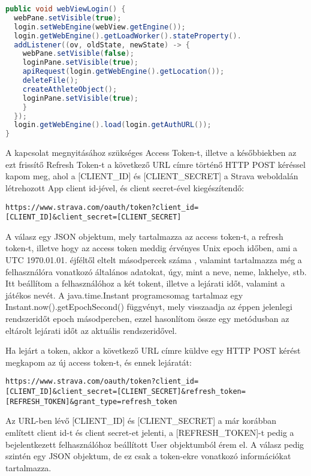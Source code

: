 \begin{lstlisting}[language=Java]
public void webViewLogin() { 
  webPane.setVisible(true); 
  login.setWebEngine(webView.getEngine()); 
  login.getWebEngine().getLoadWorker().stateProperty(). 
  addListener((ov, oldState, newState) -> { 
    webPane.setVisible(false); 
    loginPane.setVisible(true); 
    apiRequest(login.getWebEngine().getLocation()); 
    deleteFile(); 
    createAthleteObject(); 
    loginPane.setVisible(true); 
    } 
  }); 
  login.getWebEngine().load(login.getAuthURL()); 
} 
\end{lstlisting}
 

A kapcsolat megnyitásához szükséges Access Token-t, illetve a későbbiekben az ezt frissítő Refresh Token-t a következő URL címre történő HTTP POST kéréssel kapom meg, ahol a [CLIENT\_ID] és [CLIENT\_SECRET] a Strava weboldalán létrehozott App client id-jével, és client secret-ével kiegészítendő:

\begin{verbatim}
https://www.strava.com/oauth/token?client_id=[CLIENT_ID]&client_secret=[CLIENT_SECRET] 
\end{verbatim}

A válasz egy JSON objektum, mely tartalmazza az access token-t, a refresh token-t, illetve hogy az access token meddig érvényes Unix epoch időben, ami a UTC 1970.01.01. éjféltől eltelt másodpercek száma , valamint tartalmazza még a felhasználóra vonatkozó általános adatokat, úgy, mint a neve, neme, lakhelye, stb. Itt beállítom a felhasználóhoz a két tokent, illetve a lejárati időt, valamint a játékos nevét. A java.time.Instant programcsomag tartalmaz egy Instant.now().getEpochSecond() függvényt, mely visszaadja az éppen jelenlegi rendszeridőt epoch másodpercben, ezzel hasonlítom össze egy metódusban az eltárolt lejárati időt az aktuális rendszeridővel. 

Ha lejárt a token, akkor a következő URL címre küldve egy HTTP POST kérést megkapom az új access token-t, és ennek lejáratát:

\begin{verbatim}
https://www.strava.com/oauth/token?client_id=[CLIENT_ID]&client_secret=[CLIENT_SECRET]&refresh_token=[REFRESH_TOKEN]&grant_type=refresh_token 
\end{verbatim}

Az URL-ben lévő [CLIENT\_ID] és [CLIENT\_SECRET] a már korábban említett client id-t és client secret-et jelenti, a [REFRESH\_TOKEN]-t pedig a bejelentkezett felhasználóhoz beállított User objektumból érem el. A válasz pedig szintén egy JSON objektum, de ez csak a token-ekre vonatkozó információkat tartalmazza. 

